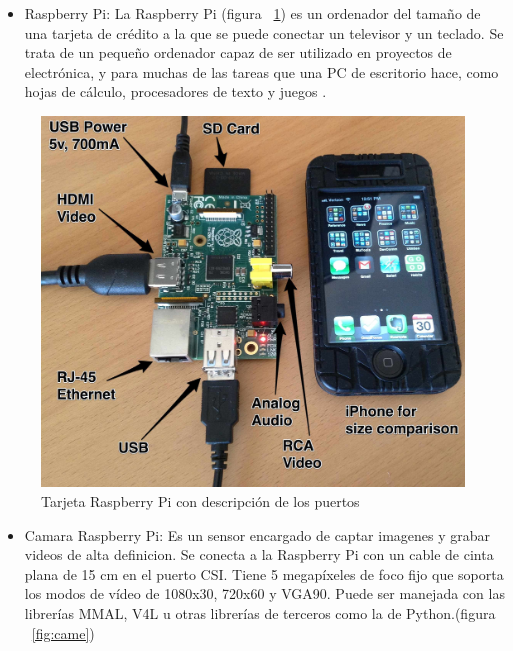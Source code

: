 \begin{itemize}
\item Raspberry Pi: La Raspberry Pi (figura ~\ref{fig:Raspe}) es un ordenador del tamaño de una tarjeta de crédito a la que se puede conectar un televisor y un teclado. Se trata de un pequeño ordenador capaz de ser utilizado en proyectos de electrónica, y para muchas de las tareas que una PC de escritorio hace, como hojas de cálculo, procesadores de texto y juegos \cite{raspberry}. 

\end{itemize}

\begin{figure}[hbtp]
\centering
\label{fig:Raspe}
\includegraphics[scale=0.1]{imagenes/raspberry_pi_iphone.jpg}
\caption{Tarjeta Raspberry Pi con descripción de los puertos}
\end{figure}

\begin{itemize}
\item Camara Raspberry Pi: Es un sensor encargado de captar imagenes y grabar videos de alta definicion. Se conecta a la Raspberry Pi con un cable de cinta plana de 15 cm en el puerto CSI. Tiene 5 megapíxeles de foco fijo que soporta los modos de vídeo de 1080x30, 720x60 y VGA90. Puede ser manejada con las librerías MMAL, V4L u otras librerías de terceros como la de Python.(figura ~\ref{fig:came}) \cite{raspberrycam} %

\end{itemize}

